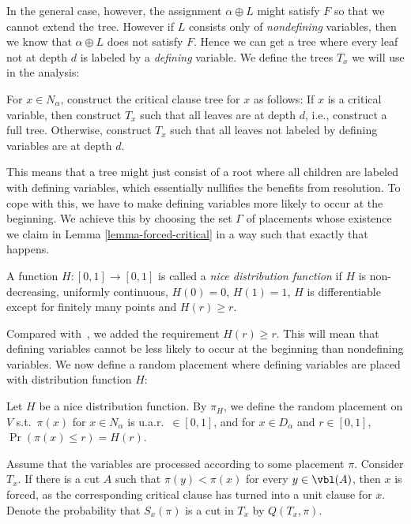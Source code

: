 In the general case, however, the assignment $\alpha\oplus L$ might satisfy $F$ so that we cannot extend the tree. However if $L$ consists only of \emph{nondefining} variables, then we know that $\alpha\oplus L$ does not satisfy $F$. Hence we can get a tree where every leaf not at depth $d$ is labeled by a \emph{defining} variable. We define the trees $T_x$ we will use in the analysis:
\begin{definition}
\label{p.d.trees}
For $x\in N_\alpha$, construct the critical clause tree for $x$ as
follows: If $x$ is a critical variable, then construct $T_x$ such that
all leaves are at depth $d$, i.e., construct a full tree. Otherwise,
construct $T_x$ such that all leaves not labeled by defining variables
are at depth $d$.
\end{definition}

This means that a tree might just consist of a root where all children are labeled with defining variables, which essentially nullifies the benefits from resolution. To cope with this, we have to make defining variables more likely to occur at the beginning. We achieve this by choosing the set $\Gamma$ of placements whose existence we claim in Lemma \ref{lemma-forced-critical} in a way such that exactly that happens. 

\begin{definition}
  A function $H:[0,1]\to [0,1]$ is called a \emph{nice distribution
    function} if $H$ is non-decreasing, uniformly continuous,
  $H(0)=0$, $H(1)=1$, $H$ is differentiable except for finitely many
  points and $H(r)\geq r$.
\end{definition}
Compared with~\cite{ppsz}, we added the requirement $H(r)\geq r$. This will
mean that defining variables cannot be less likely to occur at the
beginning than nondefining variables. We now define a random placement where defining
variables are placed with distribution function $H$:
\begin{definition}
  Let $H$ be a nice distribution function. By $\pi_H$, we define the
  random placement on $V$ s.t.\ $\pi(x)$ for $x\in N_\alpha$ is u.a.r.\
  $\in [0,1]$, and for $x\in D_\alpha$ and $r\in[0,1]$, $\Pr(\pi(x)\leq
  r)=H(r)$.
  \label{nice-random-placement}
\end{definition}

Assume that the variables are processed according to some placement
$\pi$. Consider $T_x$. If there is a cut $A$ such that $\pi(y)<\pi(x)$ for every $y\in\vbl(A)$, 
then $x$ is forced, as the
corresponding critical clause has turned into a unit clause for $x$.
Denote the probability that $S_x(\pi)$ is a cut in $T_x$ by
$Q(T_x,\pi)$.

